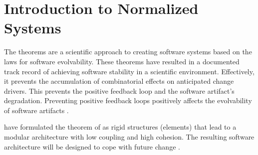 \section{Introduction to Normalized Systems} \label{sec_inro_ns}

The \ns theorems are a scientific approach to creating software systems
based on the laws for software evolvability. These theorems have resulted in a documented
track record of achieving software stability in a scientific environment. Effectively, it
prevents the accumulation of combinatorial effects on anticipated change drivers. This
prevents the positive feedback loop and the software artifact's degradation.  Preventing
positive feedback loops positively affects the evolvability of software artifacts
\parencite[]{mannaert_normalized_2009}. 

\citeauthor[]{mannaert_normalized_2009} have formulated the theorem of \ns
as rigid structures (elements) that lead to a modular architecture with low
coupling and high cohesion. The resulting software architecture will be designed to cope
with future change \parencites[]{mannaert_normalized_2009}.